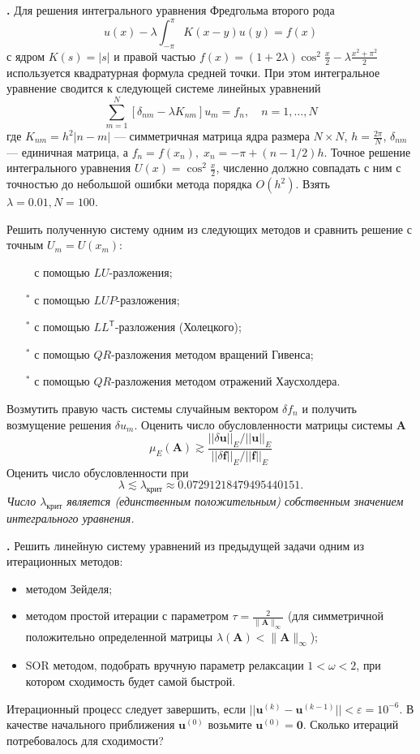 \documentclass[12pt]{article}
\newcounter{task}
\newcommand{\problem}{\par\textbf{\stepcounter{task}\thetask. }}
\begin{document}
\problem Для решения интегрального уравнения Фредгольма второго рода
\[
u(x) - \lambda \int_{-\pi}^\pi K(x-y) u(y) = f(x)
\]
с ядром $K(s) = |s|$ и правой частью $f(x) =(1 + 2\lambda)\cos^2 \frac{x}{2} - \lambda \frac{x^2 + \pi^2}{2}$
используется квадратурная формула средней точки. При этом интегральное уравнение
сводится к следующей системе линейных уравнений
\[
\sum_{m=1}^{N} [\delta_{nm} - \lambda K_{nm}] u_{m} = f_{n}, \quad n = 1,\dots,N
\]
где $K_{nm} = h^2|n-m|$ --- симметричная матрица ядра размера $N\times N$,
$h=\frac{2\pi}{N}$, $\delta_{nm}$ --- единичная матрица, а \mbox{$f_n =
f(x_n), \; x_n = -\pi + (n-1/2)h$}. Точное решение интегрального уравнения $U(x) =
\cos^2 \frac{x}{2}$, численно должно совпадать с ним с точностью до небольшой
ошибки метода порядка $O(h^2)$. Взять $\lambda = 0.01, N = 100$.

Решить полученную систему одним из следующих методов и сравнить решение с точным
$U_m = U\left(x_m\right)$:
\begin{itemize}
\item[\textbullet${}^{\phantom{*}}$] с помощью $LU$-разложения;
\item[\textbullet${}^{*}$] с помощью $LUP$-разложения;
\item[\textbullet${}^{*}$] с помощью $LL^\mathsf{T}$-разложения (Холецкого);
\item[\textbullet${}^{*}$] с помощью $QR$-разложения методом вращений Гивенса;
\item[\textbullet${}^{*}$] с помощью $QR$-разложения методом отражений
Хаусхолдера.
\end{itemize}
Возмутить правую часть системы случайным вектором $\delta f_n$ и получить
возмущение решения $\delta u_m$. Оценить число обусловленности матрицы
системы $\mathbf{A}$
\[
\mu_E(\mathbf{A}) \gtrsim
\frac
{||\delta \mathbf{u}||_E/||\mathbf{u}||_E}
{||\delta \mathbf{f}||_E/||\mathbf{f}||_E}
\]
Оценить число обусловленности при
\[
\lambda \lesssim \lambda_\text{крит} \approx 0.07291218479495440151.
\]
\emph{Число $\lambda_\text{крит}$ является (единственным положительным) собственным значением интегрального уравнения.}

\problem Решить линейную систему уравнений из предыдущей задачи одним из
итерационных методов:
\begin{itemize}
\item методом Зейделя;
\item методом простой итерации с параметром $\tau =
\frac{2}{\|\mathbf{A}\|_\infty}$ (для симметричной положительно определенной
матрицы $\lambda(\mathbf{A}) < \|\mathbf{A}\|_\infty$);
\item SOR методом, подобрать вручную параметр релаксации $1 < \omega < 2$, при
котором сходимость будет самой быстрой.
\end{itemize}
Итерационный процесс следует завершить, если $||\mathbf{u}^{(k)} - \mathbf{u}^{(k-1)}|| <
\varepsilon = 10^{-6}$. В качестве начального приближения $\mathbf{u}^{(0)}$ возьмите
$\mathbf{u}^{(0)} = \mathbf{0}$. Сколько итераций потребовалось для сходимости?
\end{document}
